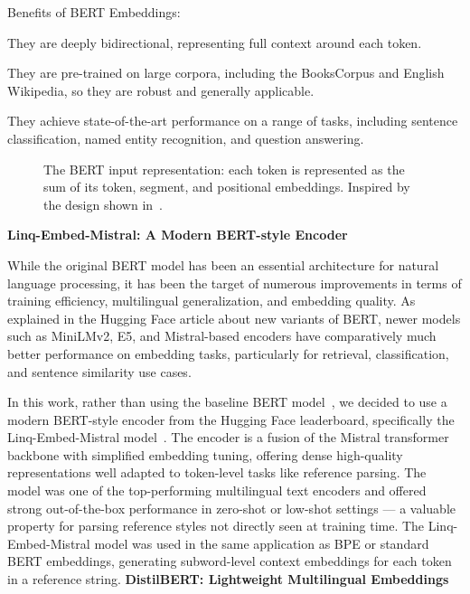 Benefits of BERT Embeddings:
\begin{compactitem}
\item They are deeply bidirectional, representing full context around each token.
\item They are pre-trained on large corpora, including the BooksCorpus and English Wikipedia, so they are robust and generally applicable.
\item They achieve state-of-the-art performance on a range of tasks, including sentence classification, named entity recognition, and question answering.
\end{compactitem}

\begin{figure}[ht]
    \centering
    
    \caption[BERT Input Representation]{The BERT input representation: each token is represented as the sum of its token, segment, and positional embeddings. Inspired by the design shown in~\cite{2019-bert}.}
    \label{fig:bert-input}
\end{figure}

\textbf{Linq-Embed-Mistral: A Modern BERT-style Encoder}

While the original BERT model has been an essential architecture for natural language processing, it has been the target of numerous improvements in terms of training efficiency, multilingual generalization, and embedding quality. As explained in the Hugging Face article about new variants of BERT, newer models such as MiniLMv2, E5, and Mistral-based encoders have comparatively much better performance on embedding tasks, particularly for retrieval, classification, and sentence similarity use cases.

In this work, rather than using the baseline BERT model~\cite{2019-bert}, we decided to use a modern BERT-style encoder from the Hugging Face leaderboard, specifically the Linq-Embed-Mistral model~\cite{linq}. The encoder is a fusion of the Mistral transformer backbone with simplified embedding tuning, offering dense high-quality representations well adapted to token-level tasks like reference parsing. The model was one of the top-performing multilingual text encoders and offered strong out-of-the-box performance in zero-shot or low-shot settings — a valuable property for parsing reference styles not directly seen at training time.
The Linq-Embed-Mistral model was used in the same application as BPE or standard BERT embeddings, generating subword-level context embeddings for each token in a reference string.
\newline
\newline
\textbf{DistilBERT: Lightweight Multilingual Embeddings}

